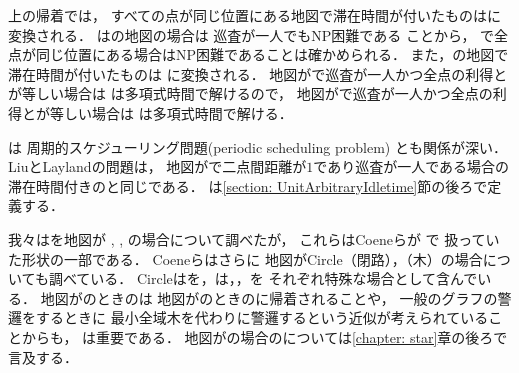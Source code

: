 上の帰着では，
すべての点が同じ位置にある地図で滞在時間が付いたものは{\graphStar}に変換される．
{\PPProfit}は{\graphStar}の地図の場合は
巡査が一人でもNP困難である\cite[Theorem~10]{coene2011charlemagne}%
ことから，
{\patProbWithDuration}で全点が同じ位置にある場合はNP困難であることは確かめられる．
%
また，{\graphLine}の地図で滞在時間が付いたものは
{\graphTree}に変換される．
地図が{\graphTree}で巡査が一人かつ全点の利得と{\maxIdletime}が等しい場合は
{\PPProfit}は多項式時間で解ける\cite[Corollary~3]{coene2011charlemagne}ので，
地図が{\graphLine}で巡査が一人かつ全点の利得と{\maxIdletime}が等しい場合は
{\patProbWithDuration}は多項式時間で解ける．

{\patProbWithDuration}は%
周期的スケジューリング問題(periodic scheduling problem)%
\cite{baruah1990preemptive, jeffay1991non, liu1973scheduling}とも関係が深い．
LiuとLayland\cite{liu1973scheduling}の問題は，
地図が{\graphUnit}で二点間距離が$1$であり巡査が一人である場合の
滞在時間付きの{\intervalSpecifiedPP}と同じである．
{\intervalSpecifiedPP}は\ref{section: UnitArbitraryIdletime}節の後ろで定義する．



我々は{\PPProfit}を地図が
{\graphLine}, {\graphStar}, {\graphUnit}%
の場合について調べたが，
これらはCoeneら\cite{coene2011charlemagne}が
{\independentPP}で
扱っていた形状の一部である．
Coeneら\cite{coene2011charlemagne}はさらに
地図がCircle（閉路），{\graphTree}（木）の場合についても調べている．
Circleは{\graphLine}を，{\graphTree}は{\graphLine}，{\graphStar}，{\graphUnit}を
それぞれ特殊な場合として含んでいる．
%
地図が{\graphLine}のときの{\patProbWithDuration}は
地図が{\graphTree}のときの{\PPProfit}に帰着されることや，
一般のグラフの警邏をするときに
最小全域木を代わりに警邏するという近似が考えられている\cite{chevaleyre2004theoretical}ことからも，
{\graphTree}は重要である．
地図が{\graphTree}の場合の{\PPProfit}については\ref{chapter: star}章の後ろで言及する．

